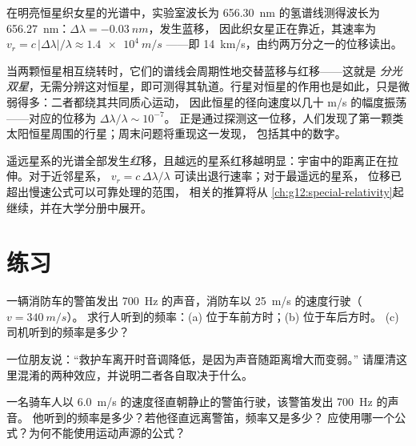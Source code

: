 \begin{example}[测算恒星的逃逸]\label{ex:g12:doppler-effect:vega}
在明亮恒星织女星的光谱中，实验室波长为
\qty{656.30}{nm} 的氢谱线测得波长为 \qty{656.27}{nm}：$\Delta\lambda = \qty{-0.03}{nm}$，发生蓝移，
因此织女星正在靠近，其速率为 $v_r = c\,|\Delta\lambda|/\lambda \approx \qty{1.4e4}{m/s}$
——即 \qty{14}{km/s}，由约两万分之一的位移读出。
\end{example}

\begin{example}\label{ex:g12:doppler-effect:wobble}
当两颗恒星相互绕转时，它们的谱线会周期性地交替蓝移与红移——这就是
\emph{分光双星}，无需分辨这对恒星，即可测得其轨道。行星对恒星的作用也是如此，只是微弱得多：二者都绕其共同质心运动，
因此恒星的径向速度以几十 \unit{m/s} 的幅度振荡——对应的位移为
$\Delta\lambda/\lambda \sim 10^{-7}$。
正是通过探测这一位移，人们发现了第一颗类太阳恒星周围的行星；周末问题将重现这一发现，
包括其中的数字。
\end{example}

\begin{remark}[星系红移]\label{rem:g12:doppler-effect:expansion}
遥远星系的光谱全部发生\emph{红}移，且越远的星系红移越明显：宇宙中的距离正在拉伸。对于近邻星系，
$v_r = c\,\Delta\lambda/\lambda$ 可读出退行速率；对于最遥远的星系，
位移已超出慢速公式可以可靠处理的范围，
相关的推算将从
\cref{ch:g12:special-relativity}起继续，并在大学分册中展开。
\end{remark}

\section{练习}

\begin{exercise}[$\star$]\label{exo:g12:doppler-effect:1}
一辆消防车的警笛发出 \qty{700}{Hz} 的声音，消防车以 \qty{25}{m/s} 的速度行驶（$v = \qty{340}{m/s}$）。
求行人听到的频率：(a) 位于车前方时；(b) 位于车后方时。
(c) 司机听到的频率是多少？
\end{exercise}

\begin{exercise}[$\star$]\label{exo:g12:doppler-effect:2}
一位朋友说：“救护车离开时音调降低，是因为声音随距离增大而变弱。”
请厘清这里混淆的两种效应，并说明二者各自取决于什么。
\end{exercise}

\begin{exercise}[$\star$]\label{exo:g12:doppler-effect:3}
一名骑车人以 \qty{6.0}{m/s} 的速度径直朝静止的警笛行驶，该警笛发出 \qty{700}{Hz} 的声音。
他听到的频率是多少？若他径直远离警笛，频率又是多少？
应使用哪一个公式？为何不能使用运动声源的公式？
\end{exercise}

